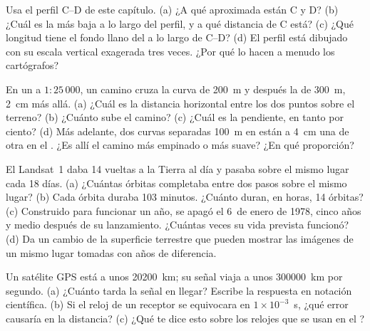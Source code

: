 \begin{exercise}[$\star\star$]\label{exo:g9:maps-of-the-earth:7}
Usa el perfil C--D de este capítulo. (a) ¿A qué  aproximada están C
y D? (b) ¿Cuál es la  más baja a lo largo del perfil, y a qué
distancia de C está? (c) ¿Qué longitud tiene el fondo llano del  a lo
largo de C--D? (d) El perfil está dibujado con su escala vertical exagerada
tres veces. ¿Por qué lo hacen a menudo los cartógrafos?
\end{exercise}

\begin{exercise}[$\star\star$]\label{exo:g9:maps-of-the-earth:8}
En un  a $1 : 25\,000$, un camino cruza la curva de \qty{200}{m} y
después la de \qty{300}{m}, \qty{2}{cm} más allá. (a) ¿Cuál es la
distancia horizontal entre los dos puntos sobre el terreno? (b) ¿Cuánto
sube el camino? (c) ¿Cuál es la pendiente, en tanto por ciento? (d) Más
adelante, dos curvas separadas \qty{100}{m} en  están a
\qty{4}{cm} una de otra en el . ¿Es allí el camino más empinado o más
suave? ¿En qué proporción?
\end{exercise}

\begin{exercise}[$\star\star$]\label{exo:g9:maps-of-the-earth:9}
El Landsat~1 daba 14 vueltas a la Tierra al día y pasaba sobre el mismo
lugar cada 18 días. (a) ¿Cuántas órbitas completaba entre dos pasos sobre
el mismo lugar? (b) Cada órbita duraba 103 minutos. ¿Cuánto duran, en
horas, 14 órbitas? (c) Construido para funcionar un año, se apagó el
6~de enero de 1978, cinco años y medio después de su lanzamiento. ¿Cuántas
veces su vida prevista funcionó? (d) Da un cambio de la superficie
terrestre que pueden mostrar las imágenes de un mismo lugar tomadas con
años de diferencia.
\end{exercise}

\begin{exercise}[$\star\star$]\label{exo:g9:maps-of-the-earth:10}
Un satélite GPS está a unos \qty{20200}{km}; su señal viaja a unos
\qty{300000}{km} por segundo. (a) ¿Cuánto tarda la señal en llegar?
Escribe la respuesta en notación científica. (b) Si el reloj de un
receptor se equivocara en $1 \times 10^{-3}$~s, ¿qué error causaría en la
distancia? (c) ¿Qué te dice esto sobre los relojes que se usan en el
?
\end{exercise}

